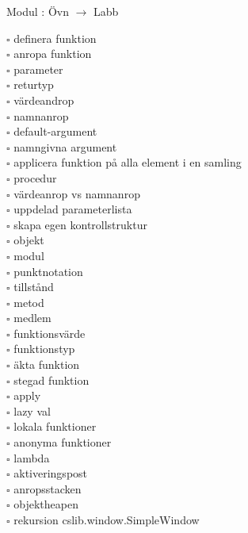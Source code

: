 
Modul : Övn  $\rightarrow$ Labb 
\begin{multicols}{3}\SlideFontTiny
$\square$ definera funktion \\
$\square$ anropa funktion \\
$\square$ parameter \\
$\square$ returtyp \\
$\square$ värdeandrop \\
$\square$ namnanrop \\
$\square$ default-argument \\
$\square$ namngivna argument \\
$\square$ applicera funktion på alla element i en samling \\
$\square$ procedur \\
$\square$ värdeanrop vs namnanrop \\
$\square$ uppdelad parameterlista \\
$\square$ skapa egen kontrollstruktur \\
$\square$ objekt \\
$\square$ modul \\
$\square$ punktnotation \\
$\square$ tillstånd \\
$\square$ metod \\
$\square$ medlem \\
$\square$ funktionsvärde \\
$\square$ funktionstyp \\
$\square$ äkta funktion \\
$\square$ stegad funktion \\
$\square$ apply \\
$\square$ lazy val \\
$\square$ lokala funktioner \\
$\square$ anonyma funktioner \\
$\square$ lambda \\
$\square$ aktiveringspost \\
$\square$ anropsstacken \\
$\square$ objektheapen \\
$\square$ rekursion  cslib.window.SimpleWindow \\     
\end{multicols}
